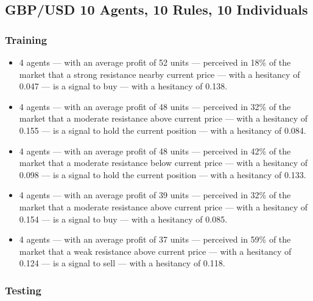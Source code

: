 \subsection{GBP/USD 10 Agents, 10 Rules, 10 Individuals}
\label{results:interpretation-gbp-usd-10agents-10rules-10individuals}

\subsubsection{Training}

{\small
  \begin{itemize}
  \item 4 agents — with an average profit of 52 units — perceived in 18\% of the
    market that a strong resistance nearby current price — with a hesitancy of
    0.047 — is a signal to buy — with a hesitancy of 0.138.
  \item 4 agents — with an average profit of 48 units — perceived in 32\% of the
    market that a moderate resistance above current price — with a hesitancy of
    0.155 — is a signal to hold the current position — with a hesitancy of
    0.084.
  \item 4 agents — with an average profit of 48 units — perceived in 42\% of the
    market that a moderate resistance below current price — with a hesitancy of
    0.098 — is a signal to hold the current position — with a hesitancy of
    0.133.
  \item 4 agents — with an average profit of 39 units — perceived in 32\% of the
    market that a moderate resistance above current price — with a hesitancy of
    0.154 — is a signal to buy — with a hesitancy of 0.085.
  \item 4 agents — with an average profit of 37 units — perceived in 59\% of the
    market that a weak resistance above current price — with a hesitancy of
    0.124 — is a signal to sell — with a hesitancy of 0.118.
  \end{itemize}
}

\subsubsection{Testing}

